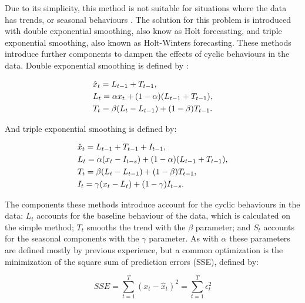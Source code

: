 \par Due to its simplicity, this method is not suitable for situations where the data has trends, or seasonal behaviours \cite{kalekar_time_2004}. The solution for
this problem is introduced with double exponential smoothing, also know as Holt forecasting, and triple exponential smoothing, also known as Holt-Winters
forecasting. These methods introduce further components to dampen the effects of cyclic behaviours in the data. Double exponential smoothing is defined by
\cite{munz_traffic_2010} :

\begin {equation*}
\centering
\begin {split}
&\hat{x}_t = L_{t-1} + T_{t-1}, \\
&L_t = \alpha x_t + (1-\alpha)(L_{t-1} + T_{t-1}), \\
&T_t = \beta (L_t - L_{t-1}) + (1-\beta)T_{t-1}.
\end {split}
\label{eq:double_exp_smooth}
\end {equation*}

\par And triple exponential smoothing is defined by:

\begin {equation*}
\centering
\begin {split}
&\hat{x}_t = L_{t-1} + T_{t-1} + I_{t-1},\\
&L_t = \alpha (x_t - I_{t-s}) + (1-\alpha)(L_{t-1} + T_{t-1}), \\
&T_t = \beta (L_t - L_{t-1}) + (1-\beta)T_{t-1}, \\
&I_t = \gamma (x_t - L_t) + (1-\gamma)I_{t-s}.
\end {split}
\label{eq:triple_exp_smooth}
\end {equation*}

\par The components these methods introduce account for the cyclic behaviours in the data: $L_t$ accounts for the baseline behaviour of the data, which is 
calculated on the simple method; $T_t$ smooths the trend with the $\beta$ parameter; and $S_t$ accounts for the seasonal components with the $\gamma$ parameter.
As with $\alpha$ these parameters are defined mostly by previous experience, but a common optimization is the minimization of the square sum of prediction errors 
(SSE), defined by:

\begin {equation*} 
    \label{eq:sse}
    SSE = \sum_{t=1}^T{(x_t-\hat{x}_{t})^2} = \sum_{t=1}^T{\epsilon_t^2}
\end {equation*}

